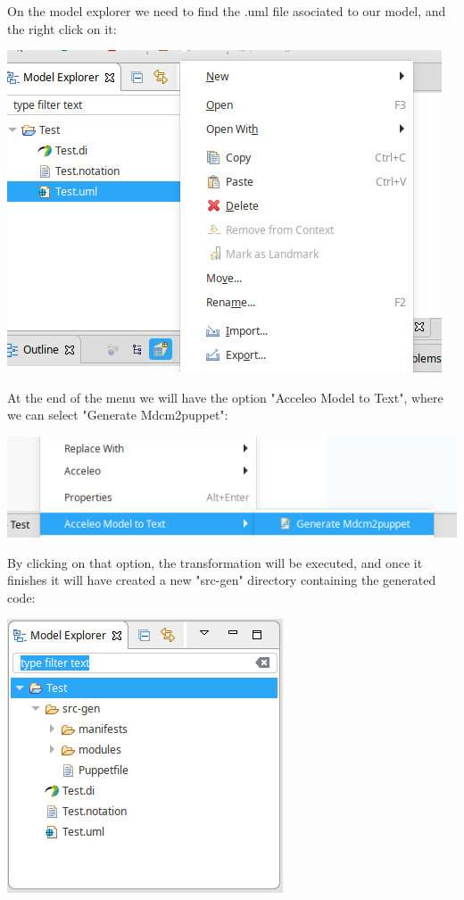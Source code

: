 \documentclass[11pt]{article}
\begin{document}
On the model explorer we need to find the .uml file asociated to our model, and the right click on it:

\begin{center}
\includegraphics[width=.9\linewidth]{images/transformation_1.png}
\end{center}

At the end of the menu we will have the option "Acceleo Model to Text", where we can select "Generate Mdcm2puppet":

\begin{center}
\includegraphics[width=.9\linewidth]{images/transformation_2.png}
\end{center}

By clicking on that option, the transformation will be executed, and once it finishes it will have created a new "src-gen" directory containing the generated code:

\begin{center}
\includegraphics[width=.9\linewidth]{images/transformation_3.png}
\end{center}
\end{document}
